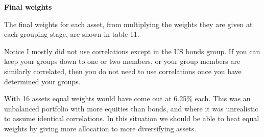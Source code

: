 \medskip \noindent\textbf{Final weights} 

The final weights for each asset, from multiplying the weights they are given at each grouping stage, are shown in table 11.

Notice I mostly did not use correlations except in the US bonds group. If you can keep your groups down to one or two members, or your group members are similarly correlated, then you do not need to use correlations once you have determined your groups.

With 16 assets equal weights would have come out at 6.25\% each. This was an unbalanced portfolio with more equities than bonds, and where it was unrealistic to assume identical correlations. In this situation we should be able to beat equal weights by giving more allocation to more diversifying assets.

\begingroup
{} 
\small 
\centering
{}
\par 
\endgroup

